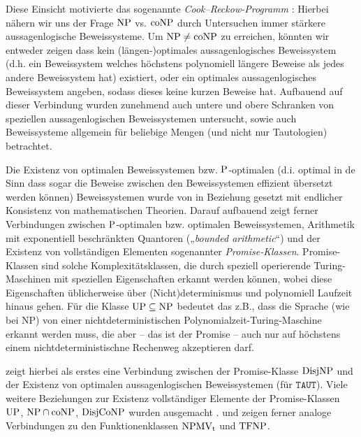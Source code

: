 Diese Einsicht motivierte das sogenannte \emph{Cook–Reckow-Programm} \parencite{buss_lectures_1996}: Hierbei nähern wir uns der Frage $\NP$ vs. $\coNP$ durch Untersuchen immer stärkere aussagenlogische Beweissysteme.
Um $\NP\neq\coNP$ zu erreichen, könnten wir entweder zeigen dass kein (längen-)optimales aussagenlogisches Beweissystem (d.h. ein Beweissystem welches höchstens polynomiell längere Beweise als jedes andere Beweissystem hat) existiert, oder ein optimales aussagenlogisches Beweissystem angeben, sodass dieses keine kurzen Beweise hat.
Aufbauend auf dieser Verbindung wurden zunehmend auch untere und obere Schranken von speziellen aussagenlogischen Beweissystemen untersucht, sowie auch Beweissysteme allgemein für beliebige Mengen (und nicht nur Tautologien) betrachtet.

Die Existenz von optimalen Beweissystemen bzw. $\P$-optimalen (d.i. optimal in de Sinn dass sogar die Beweise zwischen den Beweissystemen effizient übersetzt werden können) Beweissystemen  wurde von \textcite{krajicek_propositional_1989} in Beziehung gesetzt mit endlicher Konsistenz von mathematischen Theorien. Darauf aufbauend zeigt \textcites[Kap.~6]{pudlak_logical_2013}{pudlak_incompleteness_2017} ferner Verbindungen zwischen $\P$-optimalen bzw. optimalen Beweissystemen, Arithmetik mit exponentiell beschränkten Quantoren („\emph{bounded arithmetic}“) und der Existenz von vollständigen Elementen sogenannter \emph{Promise-Klassen}. Promise-Klassen sind solche Komplexitätsklassen, die durch speziell operierende Turing-Maschinen mit speziellen Eigenschaften erkannt werden können, wobei diese Eigenschaften üblicherweise über (Nicht)determinismus und polynomiell Laufzeit hinaus gehen. Für die Klasse $\UP\subseteq\NP$ bedeutet das z.B., dass die Sprache (wie bei NP) von einer nichtdeterministischen Polynomialzeit-Turing-Maschine erkannt werden muss, die aber – das ist der Promise – auch nur auf höchstens einem nichtdeterministischne Rechenweg akzeptieren darf.

\textcite{razborov_provably_1994} zeigt hierbei als erstes eine Verbindung zwischen der Promise-Klasse $\DisjNP$ und der Existenz von optimalen aussagenlogischen Beweissystemen (für $\mathtt{TAUT}$). Viele weitere Beziehungen zur Existenz vollständiger Elemente der Promise-Klassen $\UP$, $ \NP\cap\coNP$, $ \DisjCoNP$ wurden ausgemacht \parencites(vgl. auch)(){messner_simulation_2001}{kobler_optimal_2003}{beyersdorff_there_2011}.
\textcite{beyersdorff_nondeterministic_2009} und \textcite{pudlak_incompleteness_2017} zeigen ferner analoge Verbindungen zu den Funktionenklassen $\NPMVt$ und $\TFNP$.

